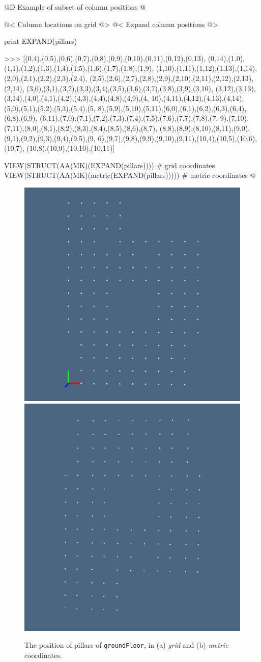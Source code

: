\documentclass[11pt,oneside]{article}    %
\begin{document}
@D Example of subset of column positions  @{
@< Column locations on grid @>
@< Expand column positions @>

print EXPAND(pillars)

>>> [(0,4),(0,5),(0,6),(0,7),(0,8),(0,9),(0,10),(0,11),(0,12),(0,13),
(0,14),(1,0),(1,1),(1,2),(1,3),(1,4),(1,5),(1,6),(1,7),(1,8),(1,9),
(1,10),(1,11),(1,12),(1,13),(1,14),(2,0),(2,1),(2,2),(2,3),(2,4),
(2,5),(2,6),(2,7),(2,8),(2,9),(2,10),(2,11),(2,12),(2,13),(2,14),
(3,0),(3,1),(3,2),(3,3),(3,4),(3,5),(3,6),(3,7),(3,8),(3,9),(3,10),
(3,12),(3,13),(3,14),(4,0),(4,1),(4,2),(4,3),(4,4),(4,8),(4,9),(4,
10),(4,11),(4,12),(4,13),(4,14),(5,0),(5,1),(5,2),(5,3),(5,4),(5,
8),(5,9),(5,10),(5,11),(6,0),(6,1),(6,2),(6,3),(6,4),(6,8),(6,9),
(6,11),(7,0),(7,1),(7,2),(7,3),(7,4),(7,5),(7,6),(7,7),(7,8),(7,
9),(7,10),(7,11),(8,0),(8,1),(8,2),(8,3),(8,4),(8,5),(8,6),(8,7),
(8,8),(8,9),(8,10),(8,11),(9,0),(9,1),(9,2),(9,3),(9,4),(9,5),(9,
6),(9,7),(9,8),(9,9),(9,10),(9,11),(10,4),(10,5),(10,6),(10,7),
(10,8),(10,9),(10,10),(10,11)]

VIEW(STRUCT(AA(MK)(EXPAND(pillars)))) # grid coordinates
VIEW(STRUCT(AA(MK)(metric(EXPAND(pillars))))) # metric coordinates
@}

\begin{figure}[htbp] %
   \centering
   \includegraphics[height=0.495\linewidth,width=0.495\linewidth]{images/pillars1} 
   \includegraphics[height=0.495\linewidth,width=0.495\linewidth]{images/pillars2} 
   \caption{The position of pillars of \texttt{groundFloor}, in (a) \emph{grid} and (b) \emph{metric} coordinates.}
   \label{fig:pillars}
\end{figure}
\end{document}
